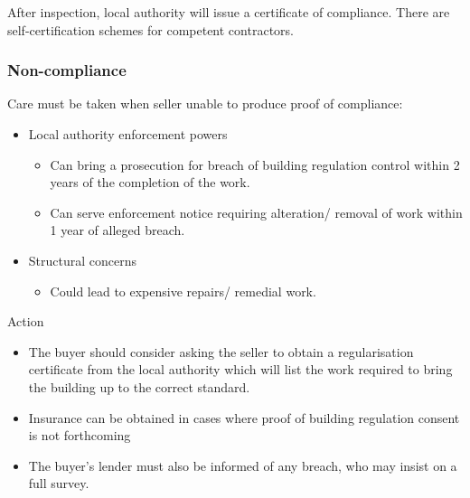 \documentclass[
]{article}
\providecommand{\tightlist}{%
  \setlength{\itemsep}{0pt}\setlength{\parskip}{0pt}}
\newenvironment{env-23740ccd-d11c-4294-a684-8ca7c2f17646}
{
    \savenotes\tcolorbox[blanker,breakable,left=5pt,borderline west={2pt}{-4pt}{aquamarine}]
}
{
    \endtcolorbox\spewnotes
}
\begin{document}
After inspection, local authority will issue a certificate of
compliance. There are self-certification schemes for competent
contractors.

\hypertarget{non-compliance}{%
\subsubsection{Non-compliance}\label{non-compliance}}

Care must be taken when seller unable to produce proof of compliance:

\begin{itemize}
\tightlist
\item
  Local authority enforcement powers

  \begin{itemize}
  \tightlist
  \item
    Can bring a prosecution for breach of building regulation control
    within 2 years of the completion of the work.
  \item
    Can serve enforcement notice requiring alteration/ removal of work
    within 1 year of alleged breach.
  \end{itemize}
\item
  Structural concerns

  \begin{itemize}
  \tightlist
  \item
    Could lead to expensive repairs/ remedial work.
  \end{itemize}
\end{itemize}

\begin{env-23740ccd-d11c-4294-a684-8ca7c2f17646}

Action

\begin{itemize}
\tightlist
\item
  The buyer should consider asking the seller to obtain a regularisation
  certificate from the local authority which will list the work required
  to bring the building up to the correct standard.
\item
  Insurance can be obtained in cases where proof of building regulation
  consent is not forthcoming
\item
  The buyer's lender must also be informed of any breach, who may insist
  on a full survey.
\end{itemize}

\end{env-23740ccd-d11c-4294-a684-8ca7c2f17646}
\end{document}
